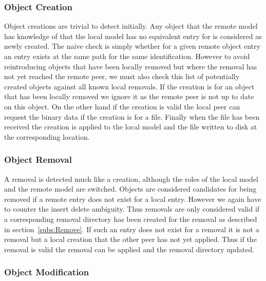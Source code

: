 \subsubsection{Object Creation}
\label{subs:Object Creation}

Object creations are trivial to detect initially.
Any object that the remote model has knowledge of that the local model has no equivalent entry for is considered as newly created.
The naive check is simply whether for a given remote object entry an entry exists at the same path for the same identification.
However to avoid reintroducing objects that have been locally removed but where the removal has not yet reached the remote peer, we must also check this list of potentially created objects against all known local removals.
If the creation is for an object that has been locally removed we ignore it as the remote peer is not up to date on this object.
On the other hand if the creation is valid the local peer can request the binary data if the creation is for a file.
Finally when the file has been received the creation is applied to the local model and the file written to disk at the corresponding location.

\subsubsection{Object Removal}
\label{subs:Object Removal}

A removal is detected much like a creation, although the roles of the local model and the remote model are switched.
Objects are considered candidates for being removed if a remote entry does not exist for a local entry.
However we again have to counter the insert delete ambiguity.
Thus removals are only considered valid if a corresponding removal directory has been created for the removal as described in section~\ref{subs:Remove}.
If such an entry does not exist for a removal it is not a removal but a local creation that the other peer has not yet applied.
Thus if the removal is valid the removal can be applied and the removal directory updated.

\subsubsection{Object Modification}
\label{subs:Object Modification}

